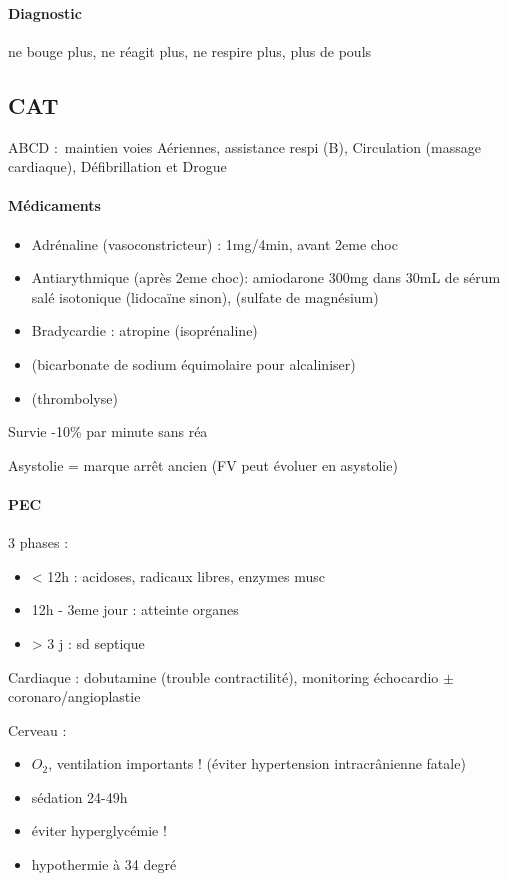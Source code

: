 \paragraph{Diagnostic} ne bouge plus, ne réagit plus, ne respire plus, plus de
pouls

\subsection{CAT}
ABCD : maintien voies Aériennes, assistance respi (B), Circulation (massage
cardiaque), Défibrillation et Drogue

\paragraph{Médicaments}
\begin{itemize}
  \item Adrénaline (vasoconstricteur) : 1mg/4min, avant 2eme choc
  \item Antiarythmique (après 2eme choc): amiodarone 300mg dans 30mL de sérum
    salé isotonique (lidocaïne sinon), (sulfate
    de magnésium)
  \item Bradycardie : atropine (isoprénaline)
  \item (bicarbonate de sodium équimolaire pour alcaliniser)
  \item (thrombolyse)
\end{itemize}

Survie -10\% par minute sans réa

Asystolie = marque arrêt ancien (FV peut évoluer en asystolie)

\paragraph{PEC}
3 phases :
\begin{itemize}
  \item < 12h : acidoses, radicaux libres, enzymes musc
  \item 12h - 3eme jour : atteinte organes
  \item  > 3 j : sd septique
\end{itemize}

Cardiaque : dobutamine (trouble contractilité), monitoring échocardio $\pm$
coronaro/angioplastie

Cerveau :
\begin{itemize}
  \item $O_2$, ventilation importants ! (éviter hypertension intracrânienne
    fatale)
  \item sédation 24-49h
  \item éviter hyperglycémie !
  \item hypothermie à 34 degré
\end{itemize}


